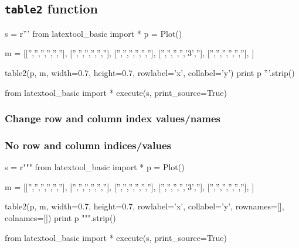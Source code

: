 \subsection{\texttt{table2} function}


\begin{python}
s = r'''
from latextool_basic import *
p = Plot()

m = [['','','','','',''],
     ['','','','','',''],
     ['','','','','',''],
     ['','','','','3',''],
     ['','','','','',''],
     ]

table2(p, m, width=0.7, height=0.7, rowlabel='x', collabel='y')
print p
'''.strip()

from latextool_basic import *
execute(s, print_source=True)
\end{python}


\newpage
\subsubsection{Change row and column index values/names}



\newpage
\subsubsection{No row and column indices/values}

\begin{python}
s = r"""
from latextool_basic import *
p = Plot()

m = [['','','','','',''],
     ['','','','','',''],
     ['','','','','',''],
     ['','','','','3',''],
     ['','','','','',''],
     ]

table2(p, m, width=0.7, height=0.7, rowlabel='x', collabel='y',
       rownames=[],
       colnames=[])
print p
""".strip()

from latextool_basic import *
execute(s, print_source=True)
\end{python}


